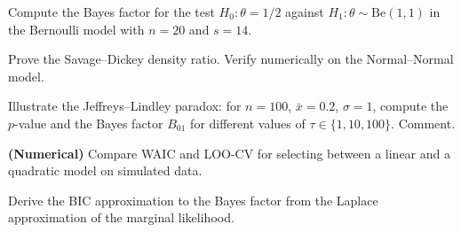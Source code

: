 \begin{exercise}
Compute the Bayes factor for the test $H_0 : \theta = 1/2$ against
$H_1 : \theta \sim \text{Be}(1,1)$ in the Bernoulli model with
$n = 20$ and $s = 14$.
\end{exercise}

\begin{exercise}
Prove the Savage--Dickey density ratio. Verify numerically on the
Normal--Normal model.
\end{exercise}

\begin{exercise}
Illustrate the Jeffreys--Lindley paradox: for $n = 100$,
$\bar{x} = 0.2$, $\sigma = 1$, compute the $p$-value and the Bayes
factor $B_{01}$ for different values of $\tau \in \{1, 10, 100\}$.
Comment.
\end{exercise}

\begin{exercise}
\textbf{(Numerical)} Compare WAIC and LOO-CV for selecting between a
linear and a quadratic model on simulated data.
\end{exercise}

\begin{exercise}
Derive the BIC approximation to the Bayes factor from the Laplace
approximation of the marginal likelihood.
\end{exercise}
